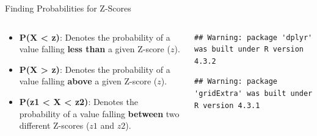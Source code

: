 \documentclass[
  ignorenonframetext,
]{beamer}
\providecommand{\tightlist}{%
  \setlength{\itemsep}{0pt}\setlength{\parskip}{0pt}}
\begin{document}
\begin{frame}[fragile]{Finding Probabilities for Z-Scores}
\label{finding-probabilities-for-z-scores}
\begin{columns}[T]
\begin{column}{0.48\textwidth}
\vspace{1cm}

\begin{itemize}
\tightlist
\item
  \textbf{P(X \textless{} z)}: Denotes the probability of a value
  falling \textbf{less than} a given Z-score (\(z\)).
\end{itemize}

\vspace{1cm}

\begin{itemize}
\tightlist
\item
  \textbf{P(X \textgreater{} z)}: Denotes the probability of a value
  falling \textbf{above} a given Z-score (\(z\)).
\end{itemize}

\vspace{1cm}

\begin{itemize}
\tightlist
\item
  \textbf{P(z1 \textless{} X \textless{} z2)}: Denotes the probability
  of a value falling \textbf{between} two different Z-scores (\(z1\) and
  \(z2\)).
\end{itemize}
\end{column}

\begin{column}{0.48\textwidth}
\begin{verbatim}
## Warning: package 'dplyr' was built under R version 4.3.2
\end{verbatim}

\begin{verbatim}
## Warning: package 'gridExtra' was built under R version 4.3.1
\end{verbatim}


\end{column}
\end{columns}
\end{frame}
\end{document}
